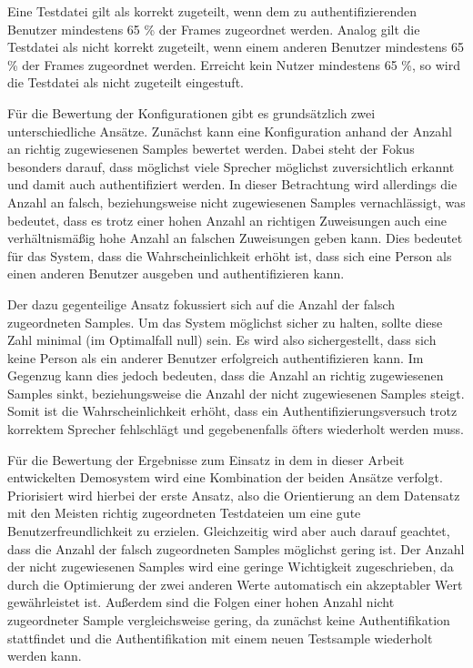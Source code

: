 Eine Testdatei gilt als korrekt zugeteilt, wenn dem zu authentifizierenden Benutzer mindestens 65 \% der Frames zugeordnet werden.
Analog gilt die Testdatei als nicht korrekt zugeteilt, wenn einem anderen Benutzer mindestens 65 \% der Frames zugeordnet werden.
Erreicht kein Nutzer mindestens 65 \%, so wird die Testdatei als nicht zugeteilt eingestuft.

Für die Bewertung der Konfigurationen gibt es grundsätzlich zwei unterschiedliche Ansätze.
Zunächst kann eine Konfiguration anhand der Anzahl an richtig zugewiesenen Samples bewertet werden.
Dabei steht der Fokus besonders darauf, dass möglichst viele Sprecher möglichst zuversichtlich erkannt und damit auch authentifiziert werden.
In dieser Betrachtung wird allerdings die Anzahl an falsch, beziehungsweise nicht zugewiesenen Samples vernachlässigt, was bedeutet, dass es trotz einer hohen Anzahl an richtigen Zuweisungen auch eine verhältnismäßig hohe Anzahl an falschen Zuweisungen geben kann.
Dies bedeutet für das System, dass die Wahrscheinlichkeit erhöht ist, dass sich eine Person als einen anderen Benutzer ausgeben und authentifizieren kann.

Der dazu gegenteilige Ansatz fokussiert sich auf die Anzahl der falsch zugeordneten Samples.
Um das System möglichst sicher zu halten, sollte diese Zahl minimal (im Optimalfall null) sein.
Es wird also sichergestellt, dass sich keine Person als ein anderer Benutzer erfolgreich authentifizieren kann.
Im Gegenzug kann dies jedoch bedeuten, dass die Anzahl an richtig zugewiesenen Samples sinkt, beziehungsweise die Anzahl der nicht zugewiesenen Samples steigt.
Somit ist die Wahrscheinlichkeit erhöht, dass ein Authentifizierungsversuch trotz korrektem Sprecher fehlschlägt und gegebenenfalls öfters wiederholt werden muss.

Für die Bewertung der Ergebnisse zum Einsatz in dem in dieser Arbeit entwickelten Demosystem wird eine Kombination der beiden Ansätze verfolgt.
Priorisiert wird hierbei der erste Ansatz, also die Orientierung an dem Datensatz mit den Meisten richtig zugeordneten Testdateien um eine gute Benutzerfreundlichkeit zu erzielen.
Gleichzeitig wird aber auch darauf geachtet, dass die Anzahl der falsch zugeordneten Samples möglichst gering ist.
Der Anzahl der nicht zugewiesenen Samples wird eine geringe Wichtigkeit zugeschrieben, da durch die Optimierung der zwei anderen Werte automatisch ein akzeptabler Wert gewährleistet ist.
Außerdem sind die Folgen einer hohen Anzahl nicht zugeordneter Sample vergleichsweise gering, da zunächst keine Authentifikation stattfindet und die Authentifikation mit einem neuen Testsample wiederholt werden kann.

